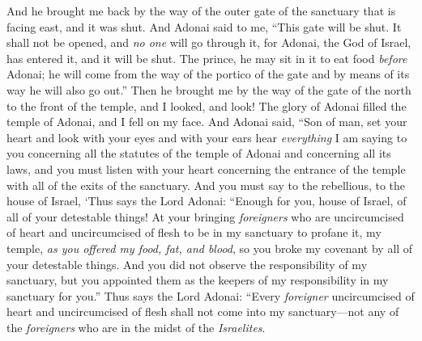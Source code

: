\begin{biblechapter} %
 And he brought me back by the way of the outer gate of the sanctuary that is facing east, and it was shut.
\verse And Adonai said to me, “This gate will be shut. It shall not be opened, and \textit{no one} will go through it, for Adonai, the God of Israel, has entered it, and it will be shut.
\verse The prince, he may sit in it to eat food \textit{before} Adonai; he will come from the way of the portico of the gate and by means of its way he will also go out.”
\verse Then he brought me by the way of the gate of the north to the front of the temple, and I looked, and look! The glory of Adonai filled the temple of Adonai, and I fell on my face.
\verse And Adonai said, “Son of man, set your heart and look with your eyes and with your ears hear \textit{everything} I am saying to you concerning all the statutes of the temple of Adonai and concerning all its laws, and you must listen with your heart concerning the entrance of the temple with all of the exits of the sanctuary.
\verse And you must say to the rebellious, to the house of Israel, ‘Thus says the Lord Adonai: “Enough for you, house of Israel, of all of your detestable things!
\verse At your bringing \textit{foreigners} who are uncircumcised of heart and uncircumcised of flesh to be in my sanctuary to profane it, my temple, \textit{as you offered my food, fat, and blood}, so you broke my covenant by all of your detestable things.
\verse And you did not observe the responsibility of my sanctuary, but you appointed them as the keepers of my responsibility in my sanctuary for you.”
\verse Thus says the Lord Adonai: “Every \textit{foreigner} uncircumcised of heart and uncircumcised of flesh shall not come into my sanctuary—not any of the \textit{foreigners} who are in the midst of the \textit{Israelites}.

\end{biblechapter}
